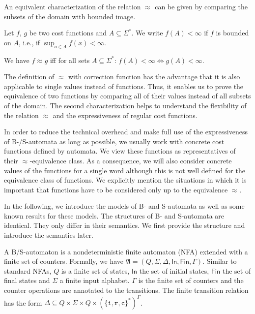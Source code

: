 \documentclass{LMCS}
\newcommand{\Equiv}{\Leftrightarrow}
\newcommand{\automatonA}{\mathfrak A}
\newcommand{\In}{\mathsf{In}}
\newcommand{\Fin}{\mathsf{Fin}}
\newcommand{\costEquiv}[1][\alpha]{\approx_{#1}}
\newcommand{\iOp}{\ensuremath{\mathtt{i}}}
\newcommand{\rOp}{\ensuremath{\mathtt{r}}}
\newcommand{\cOp}{\ensuremath{\mathtt{c}}}
\begin{document}
An equivalent characterization of the relation $\costEquiv[]$ can be given by
comparing the subsets of the domain with bounded image. 

\begin{lem}
\label{lem:SecondCostFunctionDefinition}
	Let $f$, $g$ be two cost functions and $A \subseteq \Sigma^*$. We write
$f(A) < \infty$ if $f$ is bounded on $A$, i.e., if $\sup_{a \in A} f(x) <
\infty$. 

We have $f \costEquiv[] g$ iff for all sets $A \subseteq \Sigma^*$: $f(A) <
\infty \Equiv g(A) < \infty$. 
\end{lem}

The definition of $\costEquiv[]$ with correction function has the
advantage that it is also applicable to single values instead of functions.
Thus, it enables us to prove the equivalence of two functions by comparing all
of their values instead of all subsets of the domain. The second
characterization helps to understand the flexibility of the relation
$\costEquiv[]$ and the expressiveness of regular cost functions. 

In order to
reduce the technical overhead and make full use of the expressiveness of 
B-/S-automata as long as possible, we usually work with concrete cost functions 
defined by automata. We view these functions as representatives of their 
$\costEquiv[]$-equivalence class. As a consequence, we will also consider
concrete values of the functions for a single word although this is not
well defined for the equivalence class of functions. We explicitly mention the
situations in which it is important that functions have to be considered
only up to the equivalence $\costEquiv[]$.

In the following, we introduce the models of B- and S-automata as well as some
known results for these models. The structures of B- and S-automata are identical.
They only differ in their semantics. We first provide the structure and
introduce the semantics later.

\begin{defi}
A B/S-automaton is a nondeterministic finite automaton (NFA) extended with a
finite set of counters. Formally, we have $\automatonA = (Q, \Sigma, \Delta, \In,\Fin,\Gamma)$.
Similar to standard NFAs, $Q$ is a finite set of states, $\In$ the set of
initial states, $\Fin$ the set of final states and $\Sigma$ a finite input
alphabet. $\Gamma$ is the finite set of counters and the counter operations 
are annotated to the transitions. The finite transition relation has the 
form $\Delta \subseteq Q \times \Sigma \times Q \times (\{\iOp,\rOp,\cOp\}^*)^\Gamma$.
\end{defi}
\end{document}
